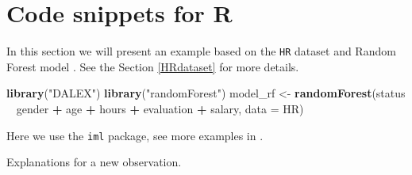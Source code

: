 \documentclass[]{book}
\newenvironment{Shaded}{\begin{snugshade}}{\end{snugshade}}
\newcommand{\DataTypeTok}[1]{\textcolor[rgb]{0.13,0.29,0.53}{#1}}
\newcommand{\DecValTok}[1]{\textcolor[rgb]{0.00,0.00,0.81}{#1}}
\newcommand{\FloatTok}[1]{\textcolor[rgb]{0.00,0.00,0.81}{#1}}
\newcommand{\KeywordTok}[1]{\textcolor[rgb]{0.13,0.29,0.53}{\textbf{#1}}}
\newcommand{\NormalTok}[1]{#1}
\newcommand{\OperatorTok}[1]{\textcolor[rgb]{0.81,0.36,0.00}{\textbf{#1}}}
\newcommand{\StringTok}[1]{\textcolor[rgb]{0.31,0.60,0.02}{#1}}
\theoremstyle{definition}
\theoremstyle{definition}
\theoremstyle{definition}
\theoremstyle{remark}
\begin{document}
\hypertarget{code-snippets-for-r-2}{%
\section{Code snippets for R}\label{code-snippets-for-r-2}}

In this section we will present an example based on the \texttt{HR}
dataset and Random Forest model \citep{R-randomForest}. See the Section
\ref{HRdataset} for more details.

\begin{Shaded}
\begin{Highlighting}[]
\KeywordTok{library}\NormalTok{(}\StringTok{"DALEX"}\NormalTok{)}
\KeywordTok{library}\NormalTok{(}\StringTok{"randomForest"}\NormalTok{)}
\NormalTok{model_rf <-}\StringTok{ }\KeywordTok{randomForest}\NormalTok{(status }\OperatorTok{~}\StringTok{ }\NormalTok{gender }\OperatorTok{+}\StringTok{ }\NormalTok{age }\OperatorTok{+}\StringTok{ }\NormalTok{hours }\OperatorTok{+}\StringTok{ }\NormalTok{evaluation }\OperatorTok{+}\StringTok{ }\NormalTok{salary, }\DataTypeTok{data =}\NormalTok{ HR)}
\end{Highlighting}
\end{Shaded}

Here we use the \texttt{iml} package, see more examples in
\citep{imlPackage}.

\begin{Shaded}
\end{Shaded}

Explanations for a new observation.

\begin{Shaded}
\end{Shaded}
\end{document}
